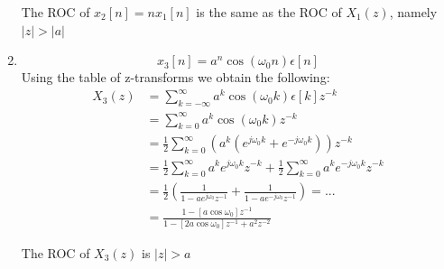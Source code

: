 \documentclass{article}
\begin{document}
\begin{enumerate}
        The ROC of $x_2[n]= nx_1[n]$ is the same as the ROC of $X_1(z)$, namely $|z| > |a|$
\item
    $$
        x_3[n]= a^n\cos(\omega_0n)\epsilon[n]
    $$
    Using the table of z-transforms we obtain the following:
    \begin{align}
        X_3(z) &= \sum_{k=-\infty}^{\infty} a^k\cos(\omega_0k)\epsilon[k]z^{-k} \nonumber \\
               &= \sum_{k=0}^{\infty} a^k\cos(\omega_0k)z^{-k} \nonumber \\
               &= \frac{1}{2} \sum_{k=0}^{\infty} \left( a^k\left( e^{j\omega_0k} +e^{-j\omega_0k} \right) \right)z^{-k} \nonumber \\
               &= \frac{1}{2}\sum_{k=0}^{\infty} a^ke^{j\omega_0k}z^{-k} + \frac{1}{2}\sum_{k=0}^{\infty} a^ke^{-j\omega_0k}z^{-k} \nonumber \\
               &= \frac{1}{2}\left( \frac{1}{1-ae^{j\omega_0}z^{-1}} + \frac{1}{1-ae^{-j\omega_0}z^{-1}} \right)= ... \nonumber \\
               &= \frac{1-[a\cos\omega_0]z^{-1}}{1-[2a\cos\omega_0]z^{-1}+a^2z^{-2}} \nonumber
    \end{align}

        The ROC of $X_3(z)$ is $|z| > a$
\end{enumerate}
\end{document}
